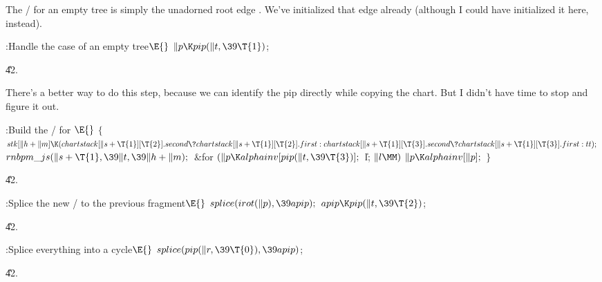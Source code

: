 The \RNBPM/ for an empty tree is simply the
unadorned root edge .
We've initialized that edge already (although I could have
initialized it here, instead).

\Y\B\4:Handle the case of an empty tree\X${}\E{}$\6
$\|p\K\\{pip}(\|t,\39\T{1}){}$;\par
\U42.\fi

There's a better way to do this step, because
we can identify the pip 
directly while copying the chart. But I didn't have time to
stop and figure it out.

\Y\B\4:Build the \RNBPM/ for \X${}\E{}$\6
${}\{{}$\1\6
${}\\{stk}[\|h+\|m]\K(\\{chartstack}[\|s+\T{1}][\T{2}].\\{second}\?%
\\{chartstack}[\|s+\T{1}][\T{2}].\\{first}:\\{chartstack}[\|s+\T{1}][\T{3}].%
\\{second}\?\\{chartstack}[\|s+\T{1}][\T{3}].\\{first}:\\{tt});{}$\6
${}\\{rnbpm\_js}(\|s+\T{1},\39\|t,\39\|h+\|m);{}$\6
\&{for} ${}(\|p\K\\{alphainv}[\\{pip}(\|t,\39\T{3})];{}$ \|l; ${}\|l\MM){}$\1\5
${}\|p\K\\{alphainv}[\|p];{}$\2\6
\4${}\}{}$\2\par
\U42.\fi

\B{}:Splice the new \RNBPM/ to the previous
fragment\X${}\E{}$\6
$\\{splice}(\\{irot}(\|p),\39\\{apip});{}$\6
${}\\{apip}\K\\{pip}(\|t,\39\T{2}){}$;\par
\U42.\fi

\B{}:Splice everything into a cycle\X${}\E{}$%
\6
$\\{splice}(\\{pip}(\|r,\39\T{0}),\39\\{apip}){}$;\par
\U42.\fi

